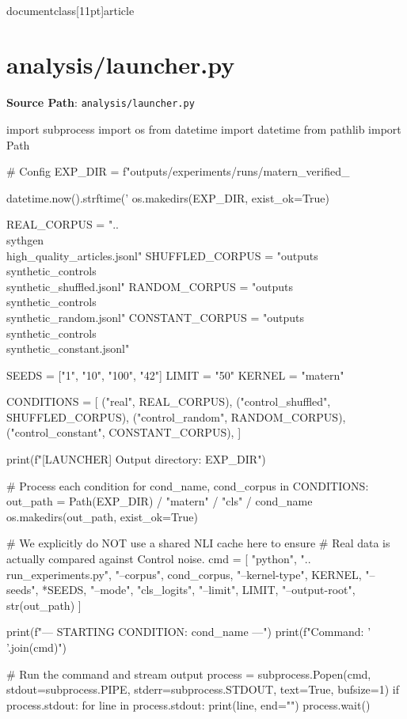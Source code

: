 \\documentclass[11pt]{article}
\begin{document}
\section*{analysis/launcher.py}
\textbf{Source Path}: \texttt{analysis/launcher.py}\par
\bigskip
\begin{CodeBlock}
import subprocess
import os
from datetime import datetime
from pathlib import Path

# Config
EXP_DIR = f"outputs/experiments/runs/matern_verified_{datetime.now().strftime('%
os.makedirs(EXP_DIR, exist_ok=True)

REAL_CORPUS = "..\\sythgen\\high_quality_articles.jsonl"
SHUFFLED_CORPUS = "outputs\\synthetic_controls\\synthetic_shuffled.jsonl"
RANDOM_CORPUS = "outputs\\synthetic_controls\\synthetic_random.jsonl"
CONSTANT_CORPUS = "outputs\\synthetic_controls\\synthetic_constant.jsonl"

SEEDS = ["1", "10", "100", "42"]
LIMIT = "50"
KERNEL = "matern"

CONDITIONS = [
    ("real", REAL_CORPUS),
    ("control_shuffled", SHUFFLED_CORPUS),
    ("control_random", RANDOM_CORPUS),
    ("control_constant", CONSTANT_CORPUS),
]

print(f"[LAUNCHER] Output directory: {EXP_DIR}")

# Process each condition
for cond_name, cond_corpus in CONDITIONS:
    out_path = Path(EXP_DIR) / "matern" / "cls" / cond_name
    os.makedirs(out_path, exist_ok=True)
    
    # We explicitly do NOT use a shared NLI cache here to ensure 
    # Real data is actually compared against Control noise.
    cmd = [
        "python", "..\\run_experiments.py",
        "--corpus", cond_corpus,
        "--kernel-type", KERNEL,
        "--seeds", *SEEDS,
        "--mode", "cls_logits",
        "--limit", LIMIT,
        "--output-root", str(out_path)
    ]
    
    print(f"\n[LAUNCHER] --- STARTING CONDITION: {cond_name} ---")
    print(f"Command: {' '.join(cmd)}")
    
    # Run the command and stream output
    process = subprocess.Popen(cmd, stdout=subprocess.PIPE, stderr=subprocess.STDOUT, text=True, bufsize=1)
    if process.stdout:
        for line in process.stdout:
            print(line, end="")
    process.wait()
    
}
\end{CodeBlock}
\end{document}
